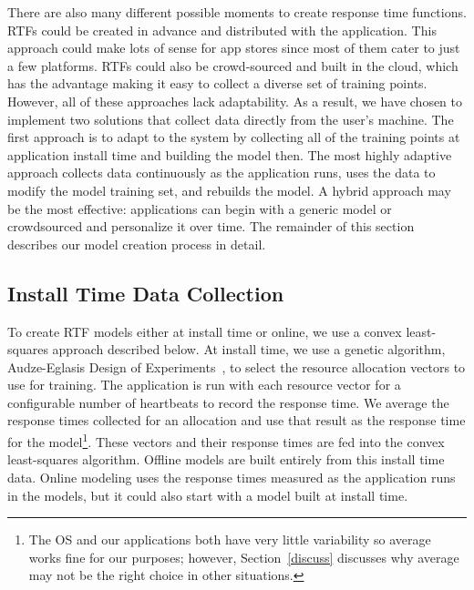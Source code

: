 There are also many different possible moments to create response time functions.  RTFs could be created in advance and distributed with the application. This approach could make lots of sense for app stores since most of them cater to just a few platforms. RTFs could also be crowd-sourced and built in the cloud, which has the advantage making it easy to collect a diverse set of training points.  However, all of these approaches lack adaptability.  As a result, we have chosen to implement two solutions that collect data directly from the user's machine.  The first approach is to adapt to the system by collecting all of the training points at application install time and building the model then.  The most highly adaptive approach collects data continuously as the application runs, uses the data to modify the model training set, and rebuilds the model.  A hybrid approach may be the most effective: applications can begin with a generic model or crowdsourced and personalize it over time. The remainder of this section describes our model creation process in detail.

\subsection{Install Time Data Collection}
To create RTF models either at install time or online, we use a convex
least-squares approach described below.  At install time, we use a
genetic algorithm, Audze-Eglasis Design of
Experiments~\cite{bates-aes03}, to select the resource allocation vectors to use
for training.  The application is run with each resource vector for a configurable number of heartbeats to record the response time.  We average the response times collected for an allocation and use that result as the response time for the model\footnote{The \tess OS and our applications both have very little variability so average works fine for our purposes; however, Section~\ref{discuss} discusses why average may not be the right choice in other situations.}.  These vectors and their response times are fed into the
convex least-squares algorithm. Offline models are built entirely from this install time data.  Online modeling uses the response times measured as the application runs in the models, but it could also start with a model built at install time.


